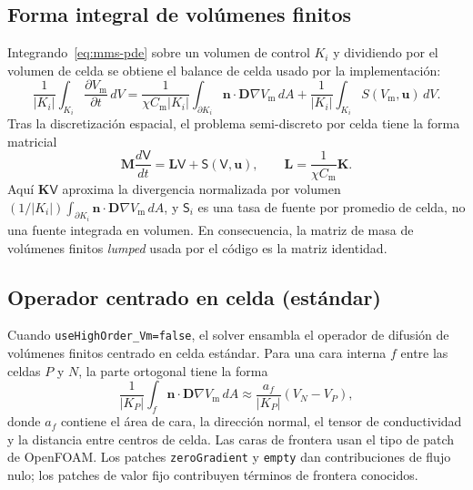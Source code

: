 \documentclass[11pt,a4paper]{article}
\newcommand{\code}[1]{\texttt{\small #1}}
\newcommand{\Vm}{V_{\text{m}}}
\newcommand{\Dten}{\mathbf{D}}
\newcommand{\grad}{\nabla}
\newcommand{\Mmass}{\mathbf{M}}
\newcommand{\Kstif}{\mathbf{K}}
\newcommand{\Lop}{\mathbf{L}}
\begin{document}
\subsection{Forma integral de volúmenes finitos}

Integrando~\eqref{eq:mms-pde} sobre un volumen de control $K_i$ y dividiendo por el volumen
de celda se obtiene el balance de celda usado por la implementación:
\begin{equation}
  \frac{1}{|K_i|}\int_{K_i}\frac{\partial \Vm}{\partial t}\,dV
  =
  \frac{1}{\chi C_{\text{m}}|K_i|}
  \int_{\partial K_i}\mathbf{n}\cdot\Dten\grad\Vm\,dA
  +
  \frac{1}{|K_i|}\int_{K_i}S(\Vm,\mathbf{u})\,dV.
  \label{eq:fv-integral}
\end{equation}
Tras la discretización espacial, el problema semi-discreto por celda tiene la
forma matricial
\begin{equation}
  \Mmass \frac{d\mathsf{V}}{dt}
  =
  \Lop \mathsf{V}
  +
  \mathsf{S}(\mathsf{V},\mathbf{u}),
  \qquad
  \Lop = \frac{1}{\chi C_{\text{m}}}\Kstif.
  \label{eq:semidiscrete}
\end{equation}
Aquí $\Kstif\mathsf{V}$ aproxima la divergencia normalizada por volumen
$(1/|K_i|)\int_{\partial K_i}\mathbf{n}\cdot\Dten\grad\Vm\,dA$, y $\mathsf{S}_i$ es una tasa
de fuente por promedio de celda, no una fuente integrada en volumen. En consecuencia, la
matriz de masa de volúmenes finitos \emph{lumped} usada por el código es la matriz identidad.

\subsection{Operador centrado en celda (estándar)}
\label{sec:std-operator}

Cuando \code{useHighOrder\_Vm=false}, el solver ensambla el operador de difusión de
volúmenes finitos centrado en celda estándar. Para una cara interna $f$ entre las celdas
$P$ y $N$, la parte ortogonal tiene la forma
\begin{equation}
  \frac{1}{|K_P|}\int_f \mathbf{n}\cdot\Dten\grad\Vm\,dA
  \approx
  \frac{a_f}{|K_P|}(V_N-V_P),
\end{equation}
donde $a_f$ contiene el área de cara, la dirección normal, el tensor de conductividad y la
distancia entre centros de celda. Las caras de frontera usan el tipo de patch de OpenFOAM.
Los patches \code{zeroGradient} y \code{empty} dan contribuciones de flujo nulo; los
patches de valor fijo contribuyen términos de frontera conocidos.
\end{document}
